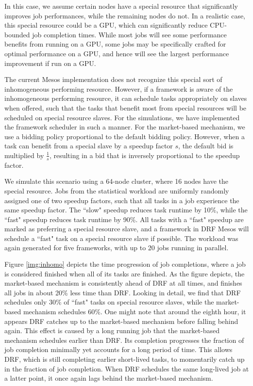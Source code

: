 \documentclass{acm_proc_article-sp}
\begin{document}
In this case, we assume certain nodes have a special resource that significantly improves job performances, while the remaining nodes do not. In a realistic case, this special resource could be a GPU, which can significantly reduce CPU-bounded job completion times. While most jobs will see some performance benefits from running on a GPU, some jobs may be specifically crafted for optimal performance on a GPU, and hence will see the largest performance improvement if run on a GPU.

The current Mesos implementation does not recognize this special sort of inhomogeneous performing resource. However, if a framework is aware of the inhomogeneous performing resource, it can schedule tasks appropriately on slaves when offered, such that the tasks that benefit most from special resources will be scheduled on special resource slaves. For the simulations, we have implemented the framework scheduler in such a manner. For the market-based mechanism, we use a bidding policy proportional to the default bidding policy. However, when a task can benefit from a special slave by a speedup factor $s$, the default bid is multiplied by $\frac{1}{s}$, resulting in a bid that is inversely proportional to the speedup factor.

We simulate this scenario using a 64-node cluster, where 16 nodes have the special resource. Jobs from the statistical workload are uniformly randomly assigned one of two speedup factors, such that all tasks in a job experience the same speedup factor. The ``slow" speedup reduces task runtime by 10\%, while the ``fast" speedup reduces task runtime by 90\%. All tasks with a ``fast" speedup are marked as preferring a special resource slave, and a framework in DRF Mesos will schedule a ``fast" task on a special resource slave if possible. The workload was again generated for five frameworks, with up to 20 jobs running in parallel.

Figure \ref{img:inhomo} depicts the time progression of job completions, where a job is considered finished when all of its tasks are finished. As the figure depicts, the market-based mechanism is consistently ahead of DRF at all times, and finishes all jobs in about 20\% less time than DRF. Looking in detail, we find that DRF schedules only 30\% of ``fast" tasks on special resource slaves, while the market-based mechanism schedules 60\%. One might note that around the eighth hour, it appears DRF catches up to the market-based mechanism before falling behind again. This effect is caused by a long running job that the market-based mechanism schedules earlier than DRF. Its completion progresses the fraction of job completion minimally yet accounts for a long period of time. This allows DRF, which is still completing earlier short-lived tasks, to momentarily catch up in the fraction of job completion. When DRF schedules the same long-lived job at a latter point, it once again lags behind the market-based mechanism.
\end{document}
